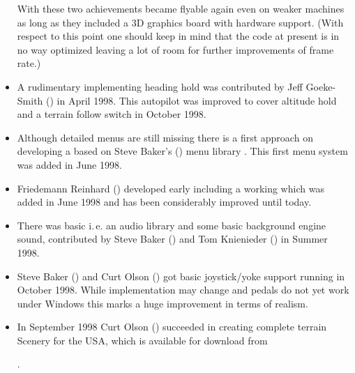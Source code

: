 \begin{itemize}
 With these two achievements \FlightGear became flyable again even on weaker
 machines as long as they included a 3D graphics board with
 hardware  support. (With respect to this point one should keep in mind that the code
 at present is in no way optimized leaving a lot of room for further
 improvements of frame rate.)

\item A rudimentary  implementing heading hold was
contributed by Jeff Goeke-Smith () in
April 1998. This autopilot was improved to cover altitude hold and a terrain follow
switch in October 1998.

\item Although detailed menus are still missing there is a first
 approach on developing a  based on Steve Baker's
  () menu library . This first menu
  system was added in June 1998.

\item Friedemann Reinhard 
()
 developed early  including a working  which was added in June 1998 and has been considerably improved until today.

\item There was basic 
i.\,e. an audio library and some basic background engine sound,
contributed by Steve Baker () and Tom Knienieder
() in Summer 1998.

\item Steve Baker
() and Curt Olson ()
got basic joystick/yoke support running in October 1998. While implementation may change
and pedals do not yet work under Windows this marks a huge improvement in terms of
realism.

\item In September 1998 Curt Olson
() succeeded in creating complete terrain Scenery for the USA,
which is available for download from

.

\end{itemize}

\longpage

